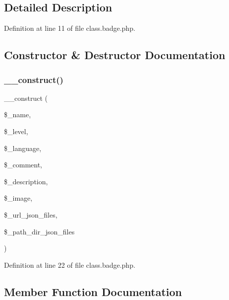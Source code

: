 \subsection{Detailed Description}


Definition at line 11 of file class.\+badge.\+php.



\subsection{Constructor \& Destructor Documentation}
\mbox{\label{class_badge_a5abb1a8e6e6c187ee5fdb8774af99571}} 
\subsubsection{\texorpdfstring{\+\_\+\+\_\+construct()}{\_\_construct()}}
{\footnotesize\ttfamily \+\_\+\+\_\+construct (\begin{DoxyParamCaption}\item[{}]{\$\+\_\+name,  }\item[{}]{\$\+\_\+level,  }\item[{}]{\$\+\_\+language,  }\item[{}]{\$\+\_\+comment,  }\item[{}]{\$\+\_\+description,  }\item[{}]{\$\+\_\+image,  }\item[{}]{\$\+\_\+url\+\_\+json\+\_\+files,  }\item[{}]{\$\+\_\+path\+\_\+dir\+\_\+json\+\_\+files }\end{DoxyParamCaption})}



Definition at line 22 of file class.\+badge.\+php.



\subsection{Member Function Documentation}
\mbox{\label{class_badge_ade99eab50004c9c474a8d0640f6c59f8}} 
